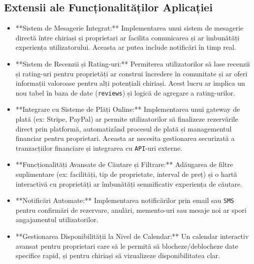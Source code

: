 \documentclass[12pt, a4paper, oneside, romanian]{teza-upb}
\begin{document}
\subsection{Extensii ale Funcționalităților Aplicației}
\begin{itemize}
	\item **Sistem de Mesagerie Integrat:** Implementarea unui sistem de mesagerie directă între chiriași și proprietari ar facilita comunicarea și ar îmbunătăți experiența utilizatorului. Aceasta ar putea include notificări în timp real.
	\item **Sistem de Recenzii și Rating-uri:** Permiterea utilizatorilor să lase recenzii și rating-uri pentru proprietăți ar construi încredere în comunitate și ar oferi informații valoroase pentru alți potențiali chiriași. Acest lucru ar implica un nou tabel în baza de date (\texttt{reviews}) și logică de agregare a rating-urilor.
	\item **Integrare cu Sisteme de Plăți Online:** Implementarea unui gateway de plată (ex: Stripe, PayPal) ar permite utilizatorilor să finalizeze rezervările direct prin platformă, automatizând procesul de plată și managementul financiar pentru proprietari. Aceasta ar necesita gestionarea securizată a tranzacțiilor financiare și integrarea cu \texttt{API}-uri externe.
	\item **Funcționalități Avansate de Căutare și Filtrare:** Adăugarea de filtre suplimentare (ex: facilități, tip de proprietate, interval de preț) și o hartă interactivă cu proprietăți ar îmbunătăți semnificativ experiența de căutare.
	\item **Notificări Automate:** Implementarea notificărilor prin email sau \texttt{SMS} pentru confirmări de rezervare, anulări, memento-uri sau mesaje noi ar spori angajamentul utilizatorilor.
	\item **Gestionarea Disponibilității la Nivel de Calendar:** Un calendar interactiv avansat pentru proprietari care să le permită să blocheze/deblocheze date specifice rapid, și pentru chiriași să vizualizeze disponibilitatea clar.
\end{itemize}
\end{document}
